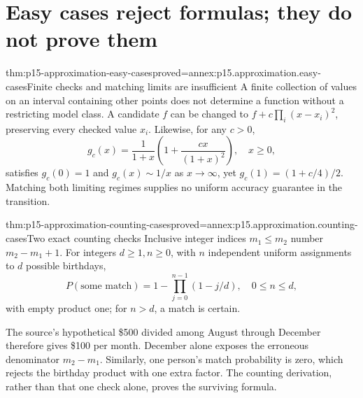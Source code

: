 \section{Easy cases reject formulas; they do not prove them}

\begin{hbtheorem}{thm:p15-approximation-easy-cases}{proved=annex:p15.approximation.easy-cases}{Finite checks and matching limits are insufficient}
A finite collection of values on an interval containing other points does
not determine a function without a restricting model class. A candidate \(f\) can be changed to
\(f+c\prod_i(x-x_i)^2\), preserving every checked value \(x_i\).
Likewise, for any \(c>0\),
\[
 g_c(x)=\frac1{1+x}\left(1+\frac{cx}{(1+x)^2}\right),\quad x\geq0,
\]
satisfies \(g_c(0)=1\) and \(g_c(x)\sim1/x\) as \(x\to\infty\), yet
\(g_c(1)=(1+c/4)/2\). Matching both limiting regimes supplies no uniform
accuracy guarantee in the transition.
\end{hbtheorem}

\begin{hbtheorem}{thm:p15-approximation-counting-cases}{proved=annex:p15.approximation.counting-cases}{Two exact counting checks}
Inclusive integer indices \(m_1\leq m_2\) number \(m_2-m_1+1\).
For integers \(d\geq1,n\geq0\), with \(n\) independent uniform
assignments to \(d\) possible birthdays,
\[
 P(\text{some match})=1-\prod_{j=0}^{n-1}(1-j/d),\quad 0\leq n\leq d,
\]
with empty product one; for \(n>d\), a match is certain.
\end{hbtheorem}

The source's hypothetical \$500 divided among August through December
therefore gives \$100 per month. December alone exposes the erroneous
denominator \(m_2-m_1\). Similarly, one person's match probability is zero,
which rejects the birthday product with one extra factor. The counting
derivation, rather than that one check alone, proves the surviving formula.

